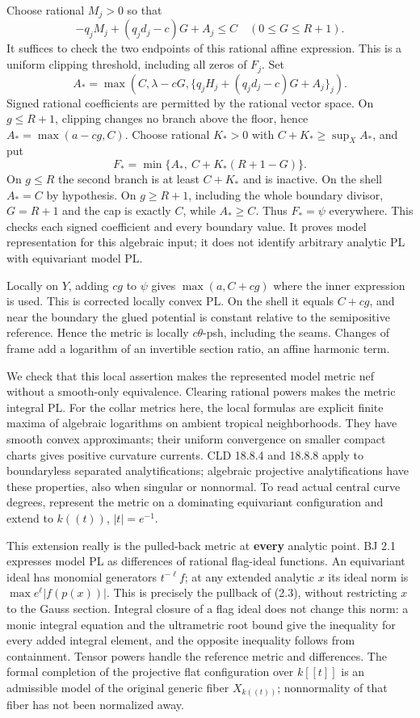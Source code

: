 \documentclass[
  10pt,
]{article}
\begin{document}
Choose rational \(M_j>0\) so that
\[-q_jM_j+(q_jd_j-c)G+A_j\le C\quad(0\le G\le R+1).\] It suffices to
check the two endpoints of this rational affine expression. This is a
uniform clipping threshold, including all zeros of \(F_j\). Set
\[A_* =\max\left(C,\lambda-cG,
              \{q_jH_j+(q_jd_j-c)G+A_j\}_j\right).\] Signed rational
coefficients are permitted by the rational vector space. On
\(g\le R+1\), clipping changes no branch above the floor, hence
\(A_*=\max(a-cg,C)\). Choose rational \(K_*>0\) with
\(C+K_*\ge\sup_X A_*\), and put
\[F_* =\min\{A_*,\ C+K_*(R+1-G)\}.\tag{7.1}\] On \(g\le R\) the second
branch is at least \(C+K_*\) and is inactive. On the shell \(A_*=C\) by
hypothesis. On \(g\ge R+1\), including the whole boundary divisor,
\(G=R+1\) and the cap is exactly \(C\), while \(A_*\ge C\). Thus
\(F_*=\psi\) everywhere. This checks each signed coefficient and every
boundary value. It proves model representation for this algebraic input;
it does not identify arbitrary analytic PL with equivariant model PL.

Locally on \(Y\), adding \(cg\) to \(\psi\) gives \(\max(a,C+cg)\) where
the inner expression is used. This is corrected locally convex PL. On
the shell it equals \(C+cg\), and near the boundary the glued potential
is constant relative to the semipositive reference. Hence the metric is
locally \(c\theta\)-psh, including the seams. Changes of frame add a
logarithm of an invertible section ratio, an affine harmonic term.

We check that this local assertion makes the represented model metric
nef without a smooth-only equivalence. Clearing rational powers makes
the metric integral PL. For the collar metrics here, the local formulas
are explicit finite maxima of algebraic logarithms on ambient tropical
neighborhoods. They have smooth convex approximants; their uniform
convergence on smaller compact charts gives positive curvature currents.
CLD 18.8.4 and 18.8.8 apply to boundaryless separated analytifications;
algebraic projective analytifications have these properties, also when
singular or nonnormal. To read actual central curve degrees, represent
the metric on a dominating equivariant configuration and extend to
\(k((t))\), \(|t|=e^{-1}\).

This extension really is the pulled-back metric at \textbf{every}
analytic point. BJ 2.1 expresses model PL as differences of rational
flag-ideal functions. An equivariant ideal has monomial generators
\(t^{-\ell}f\); at any extended analytic \(x\) its ideal norm is
\(\max e^\ell|f(p(x))|\). This is precisely the pullback of (2.3),
without restricting \(x\) to the Gauss section. Integral closure of a
flag ideal does not change this norm: a monic integral equation and the
ultrametric root bound give the inequality for every added integral
element, and the opposite inequality follows from containment. Tensor
powers handle the reference metric and differences. The formal
completion of the projective flat configuration over \(k[[t]]\) is an
admissible model of the original generic fiber \(X_{k((t))}\);
nonnormality of that fiber has not been normalized away.
\end{document}
